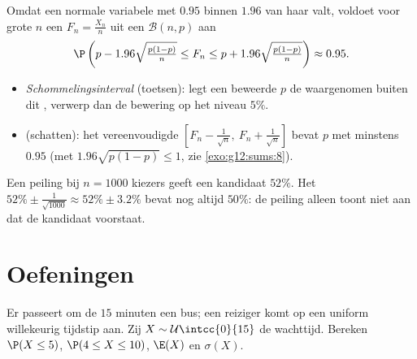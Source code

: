 \begin{method}[Schommelingsinterval op $95\%$]\label{met:g12:contdist:fluctuation}
Omdat een normale variabele met  $0.95$ binnen $1.96$
 van haar  valt, voldoet voor grote $n$ een
 $F_n = \frac{X_n}{n}$ uit een  $\mathcal B(n,p)$ aan
\[
\P\left(p - 1.96\sqrt{\tfrac{p(1-p)}{n}} \leq F_n \leq
p + 1.96\sqrt{\tfrac{p(1-p)}{n}}\right) \approx 0.95 .
\]
\begin{itemize}
  \item \emph{Schommelingsinterval} (toetsen): legt een beweerde $p$ de
        waargenomen  buiten dit , verwerp dan de bewering
        op het niveau $5\%$.
  \item \emph{} (schatten): het vereenvoudigde
        $\left[F_n - \frac{1}{\sqrt n},\ F_n + \frac{1}{\sqrt n}\right]$
        bevat $p$ met  minstens $0.95$ (met
        $1.96\sqrt{p(1-p)} \leq 1$, zie \cref{exo:g12:sums:8}).
\end{itemize}
\end{method}

\begin{example}\label{ex:g12:contdist:poll}
Een peiling bij $n = 1000$ kiezers geeft een kandidaat $52\%$. Het
 $52\% \pm \frac{1}{\sqrt{1000}} \approx 52\% \pm
3.2\%$ bevat nog altijd $50\%$: de peiling alleen toont niet aan dat de
kandidaat voorstaat.
\end{example}

\section{Oefeningen}

\begin{exercise}[$\star$]\label{exo:g12:contdist:1}
Er passeert om de $15$ minuten een bus; een reiziger komt op een uniform
willekeurig tijdstip aan. Zij $X \sim \mathcal U\intcc{0}{15}$ de wachttijd.
Bereken $\P(X \leq 5)$, $\P(4 \leq X \leq 10)$, $\E(X)$ en $\sigma(X)$.
\end{exercise}


